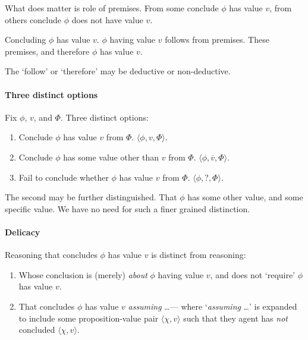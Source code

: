 \begin{note}
  What does matter is role of premises.
  From some conclude \(\phi\) has value \(v\), from others conclude \(\phi\) does not have value \(v\).
\end{note}

\begin{note}[Generally]
  Concluding \(\phi\) has value \(v\).
  \(\phi\) having value \(v\) follows from premises.
  These premises, and therefore \(\phi\) has value \(v\).

  The `follow' or `therefore' may be deductive or non-deductive.
\end{note}

\paragraph{Three distinct options}

\begin{assumption}
  Fix \(\phi\), \(v\), and \(\Phi\).
  Three distinct options:
  \begin{enumerate}
  \item Conclude \(\phi\) has value \(v\) from \(\Phi\).
    \(\langle \phi,v,\Phi \rangle\).
  \item
    Conclude \(\phi\) has some value other than \(v\) from \(\Phi\).
    \(\langle \phi,\overline{v},\Phi \rangle\).
  \item
    Fail to conclude whether \(\phi\) has value \(v\) from \(\Phi\).
    \(\langle \phi,?,\Phi \rangle\).
  \end{enumerate}
  The second may be further distinguished.
  That \(\phi\) has some other value, and some specific value.
  We have no need for such a finer grained distinction.
\end{assumption}


\paragraph{Delicacy}

\begin{note}
  Reasoning that concludes \(\phi\) has value \(v\) is distinct from reasoning:
  \begin{enumerate}[label=\Alph*., ref=(\Alph*)]
  \item
    \label{CS:delicacy:O}
    Whose conclusion is (merely) \emph{about} \(\phi\) having value \(v\), and does not `require' \(\phi\) has value \(v\).
  \item
    \label{CS:delicacy:A}
    That concludes \(\phi\) has value \(v\) \emph{assuming} \dots\space --- where `\emph{assuming} \dots\space' is expanded to include some proposition-value pair \(\langle \chi,v \rangle\) such that they agent has \emph{not} concluded \(\langle \chi,v \rangle\).
  \end{enumerate}
\end{note}

